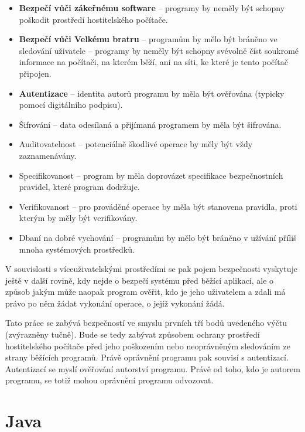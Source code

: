 \begin{itemize}
  \item {\bf Bezpečí vůči zákeřnému software} -- programy by neměly být schopny poškodit prostředí hostitelského počítače.
  \item {\bf Bezpečí vůči Velkému bratru} -- programům by mělo být bráněno ve sledování uživatele -- programy by neměly být schopny svévolně číst soukromé informace na počítači, na kterém běží, ani na síti, ke které je tento počítač připojen.
  \item {\bf Autentizace} -- identita autorů programu by měla být ověřována (typicky pomocí digitálního podpisu).
  \item Šifrování -- data odesílaná a přijímaná programem by měla být šifrována.
  \item Auditovatelnost -- potenciálně škodlivé operace by měly být vždy zaznamenávány.
  \item Specifikovanost -- program by měla doprovázet specifikace bezpečnostních pravidel, které program dodržuje.
  \item Verifikovanost -- pro prováděné operace by měla být stanovena pravidla, proti kterým by měly být verifikovány.
  \item Dbaní na dobré vychování -- programům by mělo být bráněno v užívání příliš mnoha systémových prostředků.
\end{itemize}

V souvislosti s víceuživatelskými prostředími se pak pojem bezpečnosti vyskytuje ještě v další rovině, kdy nejde o bezpečí systému před běžící aplikací, ale o způsob jakým může naopak program ověřit, kdo je jeho uživatelem a zdali má právo po něm žádat vykonání operace, o jejíž vykonání žádá.

Tato práce se zabývá bezpečností ve smyslu prvních tří bodů uvedeného výčtu (zvýrazněny tučně). Bude se tedy zabývat způsobem ochrany prostředí hostitelského počítače před jeho poškozením nebo neoprávněným sledováním ze strany běžících programů. Právě oprávnění programu pak souvisí s autentizací. Autentizací se myslí ověřování autorství programu. Právě od toho, kdo je autorem programu, se totiž mohou oprávnění programu odvozovat.

\section{Java}

